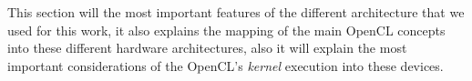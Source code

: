 \par{This section will the most important features of the different architecture that we used for this work, it also explains the 
    mapping of the main OpenCL concepts into these different hardware architectures, also it will explain the most important 
    considerations of the OpenCL's \emph{kernel} execution into these devices}.
